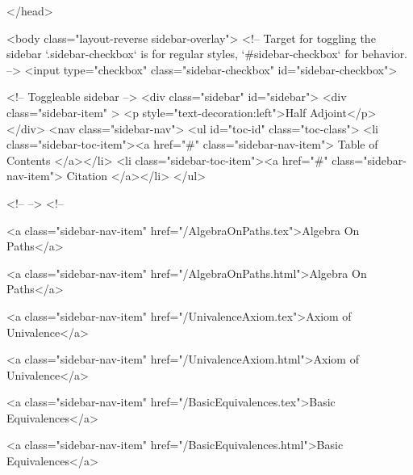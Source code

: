   
</head>




  <body class="layout-reverse sidebar-overlay">
    <!-- Target for toggling the sidebar `.sidebar-checkbox` is for regular
     styles, `#sidebar-checkbox` for behavior. -->
<input type="checkbox" class="sidebar-checkbox" id="sidebar-checkbox">

<!-- Toggleable sidebar -->
<div class="sidebar" id="sidebar">
  <div class="sidebar-item" >
    <p style="text-decoration:left">Half Adjoint</p>
  </div>
  <nav class="sidebar-nav">
    <ul id="toc-id" class="toc-class">
  <li class="sidebar-toc-item"><a href="#" class="sidebar-nav-item"> Table of Contents </a></li>
  <li class="sidebar-toc-item"><a href="#" class="sidebar-nav-item"> Citation </a></li>
</ul>


    <!--  -->
    <!-- 
      
    
      
    
      
    
      
    
      
        
      
    
      
        
          <a class="sidebar-nav-item" href="/AlgebraOnPaths.tex">Algebra On Paths</a>
        
      
    
      
        
          <a class="sidebar-nav-item" href="/AlgebraOnPaths.html">Algebra On Paths</a>
        
      
    
      
        
          <a class="sidebar-nav-item" href="/UnivalenceAxiom.tex">Axiom of Univalence</a>
        
      
    
      
        
          <a class="sidebar-nav-item" href="/UnivalenceAxiom.html">Axiom of Univalence</a>
        
      
    
      
        
          <a class="sidebar-nav-item" href="/BasicEquivalences.tex">Basic Equivalences</a>
        
      
    
      
        
          <a class="sidebar-nav-item" href="/BasicEquivalences.html">Basic Equivalences</a>
        
